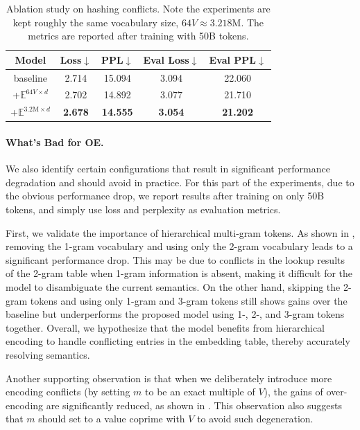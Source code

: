 \begin{table}
\centering
\caption{Ablation study on hashing conflicts. Note the experiments are kept roughly the same vocabulary size, \ie $64V\approx3.218\mathrm{M}$. The metrics are reported after training with 50B tokens.}
\begin{tabular}{c|cccc}
\toprule
Model & Loss$\downarrow$ & PPL$\downarrow$ & Eval Loss$\downarrow$ & Eval PPL$\downarrow$ \\ \midrule
baseline & 2.714 & 15.094 & 3.094 & 22.060 \\
+$\mathbb{E}^{64V\times d}$ & 2.702 & 14.892 & 3.077 & 21.710\\
+$\mathbb{E}^{3.2\mathrm{M}\times d}$ & \textbf{2.678} & \textbf{14.555} & \textbf{3.054} & \textbf{21.202}\\
\bottomrule
\end{tabular}
\label{tab:ablation_hashing_conflicts}
\end{table}




\paragraph{What's Bad for OE.}
We also identify certain configurations that result in significant performance degradation and should avoid in practice. For this part of the experiments, due to the obvious performance drop, we report results after training on only 50B tokens, and simply use loss and perplexity as evaluation metrics. 

First, we validate the importance of hierarchical multi-gram tokens. As shown in , removing the 1-gram vocabulary and using only the 2-gram vocabulary leads to a significant performance drop. This may be due to conflicts in the lookup results of the 2-gram table when 1-gram information is absent, making it difficult for the model to disambiguate the current semantics. On the other hand, skipping the 2-gram tokens and using only 1-gram and 3-gram tokens still shows gains over the baseline but underperforms the proposed model using 1-, 2-, and 3-gram tokens together. Overall, we hypothesize that the model benefits from hierarchical encoding to handle conflicting entries in the embedding table, thereby accurately resolving semantics.

Another supporting observation is that when we deliberately introduce more encoding conflicts (by setting $m$ to be an exact multiple of $V$), the gains of over-encoding are significantly reduced, as shown in . This observation also suggests that $m$ should set to a value coprime with $V$ to avoid such degeneration.


